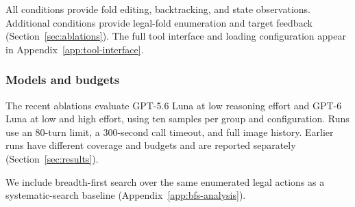 All conditions provide fold editing, backtracking, and state observations. Additional
conditions provide legal-fold enumeration and target feedback
(Section~\ref{sec:ablations}). The full tool interface and loading configuration
appear in Appendix~\ref{app:tool-interface}.


\subsubsection{Models and budgets}
\label{sec:exp-protocol}

The recent ablations evaluate GPT-5.6 Luna at low reasoning effort and GPT-6 Luna
at low and high effort, using ten samples per group and configuration. Runs use an
80-turn limit, a 300-second call timeout, and full image history. Earlier runs have
different coverage and budgets and are reported separately (Section~\ref{sec:results}).

We include breadth-first search over the same enumerated legal actions as a
systematic-search baseline (Appendix~\ref{app:bfs-analysis}).
